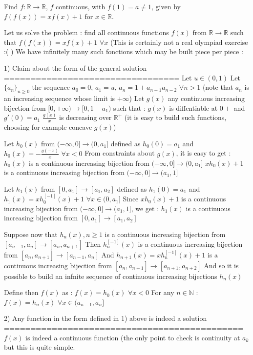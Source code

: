 \begin{solution}
	\begin{tcolorbox}Find $f : \mathbb{R} \to \mathbb{R}$, $f$ continuous, with $f(1)=a\neq 1$, given by  $f(f(x))=xf(x)+1$ for $x\in \mathbb{R}$.\end{tcolorbox}
Let us solve the problem : find all continuous functions $f(x)$ from $\mathbb R\to\mathbb R$ such that $f(f(x))=xf(x)+1$ $\forall x$
(This is certainly not a real olympiad exercise :( )
We have infinitely many such fonctions which may be built piece per piece :

1) Claim about the form of the general solution
=================================
Let $u\in(0,1)$
Let $\{a_n\}_{n\ge 0}$ the sequence $a_0=0$, $a_1=u$, $a_n=1+a_{n-1}a_{n-2}$ $\forall n>1$
(note that $a_n$ is an increasing sequence whose limit is $+\infty$)
Let $g(x)$ any continuous increasing bijection from $[0,+\infty)\to[0,1-a_1)$ such that :
$g(x)$ is diffentiable at $0+$ and $g'(0)=a_1$
$\frac{g(x)}x$ is decreasing over $\mathbb R^+$
(it is easy to build such functions, choosing for example concave $g(x)$)

Let $h_0(x)$ from $(-\infty,0]\to (0,a_1]$ defined as $h_0(0)=a_1$ and $h_0(x)=-\frac{g(-x)}x$ $\forall x<0$
From constraints about $g(x)$, it is easy to get :
$h_0(x)$ is a continuous increasing bijection from $(-\infty,0]\to(0,a_1]$
$xh_0(x)+1$ is a continuous increasing bijection from $(-\infty,0]\to(a_1,1]$

Let $h_1(x)$ from $[0,a_1]\to [a_1,a_2]$ defined as $h_1(0)=a_1$ and $h_1(x)=xh_0^{[-1]}(x)+1$ $\forall x\in(0,a_1]$
Since $xh_0(x)+1$ is a continuous increasing bijection from $(-\infty,0]\to(a_1,1]$, we get :
$h_1(x)$ is a continuous increasing bijection from $[0,a_1]\to[a_1,a_2]$

Suppose now that $h_n(x),n\ge 1$ is a continuous increasing bijection from $[a_{n-1},a_n]\to[a_n,a_{n+1}]$
Then $h_n^{[-1]}(x)$ is a continuous increasing bijection from $[a_n,a_{n+1}]\to[a_{n-1},a_n]$
And $h_{n+1}(x)=xh_n^{[-1]}(x)+1$ is a continuous increasing bijection from $[a_n,a_{n+1}]\to[a_{n+1},a_{n+2}]$
And so it is possible to build an infnite sequence of continuous increasing bijections $h_n(x)$

Define then $f(x)$ as :
$f(x)=h_0(x)$ $\forall x<0$
For any $n\in\mathbb N$ : $f(x)=h_n(x)$ $\forall x\in(a_{n-1},a_n]$

2) Any function in the form defined in 1) above is indeed a solution
=============================================
$f(x)$ is indeed a continuous function (the only point to check is continuity at $a_k$ but this is quite simple.


\end{solution}
